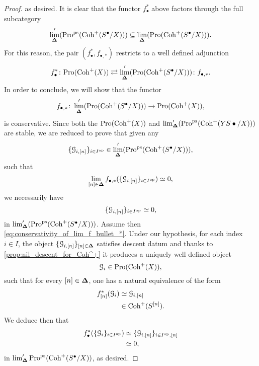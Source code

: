 \documentclass[10pt,a4paper,reqno]{amsart} %
\theoremstyle{plain}
\theoremstyle{definition}
\theoremstyle{remark}
\numberwithin{equation}{section}
\begin{document}
\begin{proof}
    as desired. 
    It is clear that the functor $f_{\bullet
    }^*$ above factors through the full subcategory
        \[
            \lim_{\bm{\Delta}}'(\mathrm{Pro}^\mathrm{ps}( \mathrm{Coh}^+(S^\bullet / X)))  \subseteq \lim_{\bm{\Delta}}(\mathrm{Pro}(\mathrm{Coh}^+(S^\bullet/X))).
        \]
    For this reason, the pair $(f_\bullet^*, f_{\bullet, *})$ restricts to a well defined adjunction
        \[
            f^*_{\bullet} \colon \mathrm{Pro}(\mathrm{Coh}^+(X))  \rightleftarrows  \lim_{\bm{\Delta}}'(\mathrm{Pro}(\mathrm{Coh}^+(S^\bullet/ X))) \colon f_{\bullet, *}.  
        \]
    In order to conclude, we will show that the functor
        \[
            f_{\bullet, *} \colon  \lim_{\bm{\Delta}}'(\mathrm{Pro}(\mathrm{Coh}^+(S^\bullet/X))) \to \mathrm{Pro}(\mathrm{Coh}^+(X)) ,  
        \]
    is conservative. Since both the \infcats $\mathrm{Pro}(\mathrm{Coh}^+(X))$ and $\lim_{\bm{\Delta} }'(\mathrm{Pro}^\mathrm{ps}(\mathrm{Coh}^+(YS\bullet/X)))$ are stable, we are reduced to prove that given any
        \[
            \{ \mathcal G_{i, [n]} \}_{i \in I^\mathrm{op}} \in \lim_{\bm{\Delta}}'(\mathrm{Pro}^\mathrm{ps}(\mathrm{Coh}^+(S^\bullet/X))),  
        \]
    such that 
        \begin{equation} \label{eq:conservativity_of_lim_f_bullet_*}
            \lim_{[n] \in \bm{\Delta} } f_{\bullet, *}( \{ \mathcal G_{i, [n]} \}_{i \in I^\mathrm{op}})  \simeq 0,
        \end{equation}
    we necessarily have
        \[
            \{ \mathcal G_{i, [n]} \}_{i \in I^\mathrm{op}} \simeq 0  ,
        \]
    in $\lim_{\bm{\Delta}}'(\mathrm{Pro}^\mathrm{ps}(\mathrm{Coh}^+(S^\bullet / X)))$.
    Assume then \eqref{eq:conservativity_of_lim_f_bullet_*}. Under our hypothesis, for each index $i \in I$, the object
    $\{ \mathcal G_{i, [n]} \}_{ [n] \in \bm{\Delta}}$ satisfies descent datum and thanks to \cref{prop:nil_descent_for_Coh^+} it produces a uniquely well defined object
        \[
            \mathcal G_i \in \mathrm{Pro}(\mathrm{Coh}^+(X)),  
        \]
    such that for every $[n] \in \bm{\Delta}$, one has a natural equivalence of the form
        \begin{align*}
            f_{[n]}^* (\mathcal G_i) & \simeq \mathcal G_{i , [n]} \\
                              & \in \mathrm{Coh}^+(S^{[n]}).
        \end{align*}
    We deduce then that  
        \begin{align*}
            f^*_{\bullet}(\{ \mathcal G_i \}_{i \in I^\mathrm{op}}) & \simeq \{\mathcal G_{i, [n]} \}_{i \in I^\mathrm{op}, [n]} \\
                                                    & \simeq 0,  
        \end{align*}
    in $\lim'_{\bm{\Delta}} \mathrm{Pro}^\mathrm{ps}(\mathrm{Coh}^+(S^\bullet/ X))$, as desired.
\end{proof}
\end{document}
